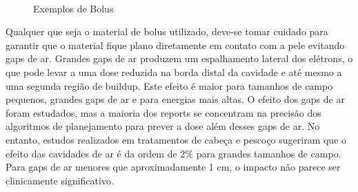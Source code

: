 \documentclass[11pt,a4paper]{article}
\begin{document}
\begin{figure}[h]
{		} \\ %
		\caption{Exemplos de Bolus}
		\label{fig:bolus}
	\end{figure}

	Qualquer que seja o material de bolus utilizado, deve-se tomar cuidado para garantir que o material fique plano diretamente em contato com a pele evitando gaps de ar. Grandes gaps de ar produzem um espalhamento lateral dos elétrons, o que pode levar a uma dose reduzida na borda distal da cavidade e até mesmo a uma segunda região de buildup. Este efeito é maior para tamanhos de campo pequenos, grandes gaps de ar e para energias mais altas. O efeito dos gaps de ar foram estudados, mas a maioria dos reports se concentram na precisão dos algoritmos de planejamento para prever a dose além desses gaps de ar. No entanto, estudos realizados em tratamentos de cabeça e pescoço sugeriram que o efeito das cavidades de ar é da ordem de 2\% para grandes tamanhos de campo. Para gaps de ar menores que aproximadamente 1 cm, o impacto não parece ser clinicamente significativo.
\end{document}
